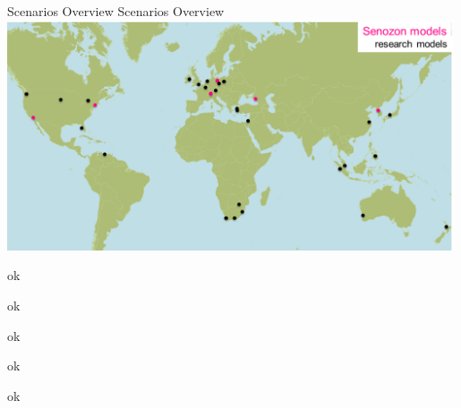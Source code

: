 \createfigure%
{Scenarios Overview}%
{Scenarios Overview}%
{\label{fig:scenarios}}%
{\includegraphics[width=0.99\textwidth, angle=0]{using/figures/scenarios}}%
{}

 ok

 ok

 \clearpage

 \clearpage



 \clearpage

 ok

 ok

 ok

